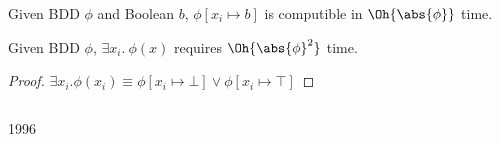 \documentclass[english, aspectratio=169]{beamer}
\begin{document}
\begin{frame}
\begin{columns}
\begin{column}{0.59\linewidth}
{        \begin{theorem}[Bryant~'86]
          Given BDD $\phi$ and Boolean $b$, $\phi[x_i \mapsto b]$ is computible in
          $\Oh{\abs{\phi}}$ time.
        \end{theorem}

        \medskip

        \begin{corollary}
          Given BDD $\phi$, $\exists x_i .\ \phi(x)$ requires $\Oh{\abs{\phi}^2}$
          time.
        \end{corollary}
        \vspace{-5pt}
        \begin{proof}
          $\exists x_i . \phi(x_i) \equiv \phi[x_i \mapsto \bot] \lor \phi[x_i \mapsto \top]$
        \end{proof}
      }
    \end{column}
  \end{columns}
\end{frame}

\begin{frame}

  \begin{center}
    \bf
    {\fontsize{42}{50}\selectfont {}}

    \vspace{10pt}

    {\Huge 1996}
  \end{center}
\end{frame}

\end{document}
